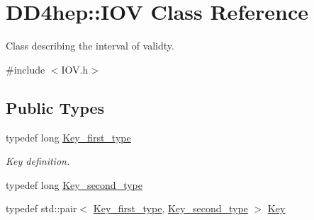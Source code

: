\hypertarget{class_d_d4hep_1_1_i_o_v}{}\section{D\+D4hep\+:\+:I\+OV Class Reference}
\label{class_d_d4hep_1_1_i_o_v}


Class describing the interval of validty.  




{\ttfamily \#include $<$I\+O\+V.\+h$>$}

\subsection*{Public Types}
\begin{DoxyCompactItemize}
\item 
typedef long \hyperlink{class_d_d4hep_1_1_i_o_v_a3f518f6b507c82c4ee614e52b3519325}{Key\+\_\+first\+\_\+type}
\begin{DoxyCompactList}\small\item\em Key definition. \end{DoxyCompactList}\item 
typedef long \hyperlink{class_d_d4hep_1_1_i_o_v_ae1e4d1584dcc17a416008a93d94376b5}{Key\+\_\+second\+\_\+type}
\item 
typedef std\+::pair$<$ \hyperlink{class_d_d4hep_1_1_i_o_v_a3f518f6b507c82c4ee614e52b3519325}{Key\+\_\+first\+\_\+type}, \hyperlink{class_d_d4hep_1_1_i_o_v_ae1e4d1584dcc17a416008a93d94376b5}{Key\+\_\+second\+\_\+type} $>$ \hyperlink{class_d_d4hep_1_1_i_o_v_a07cb46dc875296dc9cccf4ff370104ae}{Key}
\end{DoxyCompactItemize}
